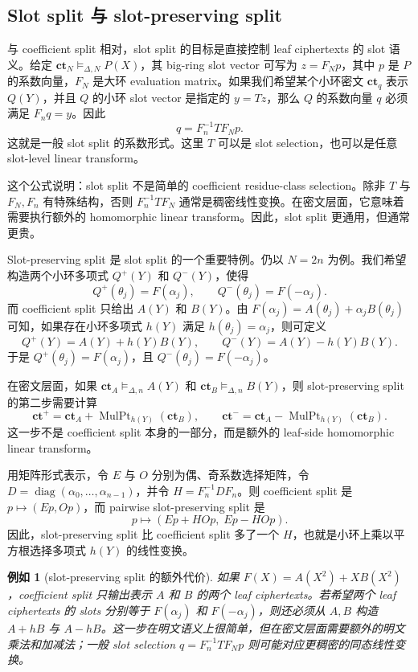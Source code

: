 \documentclass[UTF8,11pt]{article}
\newcommand{\ct}{\mathbf{ct}}
\theoremstyle{definition}
\theoremstyle{plain}
\newtheorem{example}{例如}
\begin{document}
\subsection{Slot split 与 slot-preserving split}
\label{subsec:slot-split-preserving}

与 coefficient split 相对，slot split 的目标是直接控制 leaf ciphertexts 的 slot 语义。给定 \(\ct_N\vDash_{\Delta,N}P(X)\)，其 big-ring slot vector 可写为 \(z=F_Np\)，其中 \(p\) 是 \(P\) 的系数向量，\(F_N\) 是大环 evaluation matrix。如果我们希望某个小环密文 \(\ct_q\) 表示 \(Q(Y)\)，并且 \(Q\) 的小环 slot vector 是指定的 \(y=Tz\)，那么 \(Q\) 的系数向量 \(q\) 必须满足 \(F_nq=y\)。因此
\[
q=F_n^{-1}TF_Np.
\]
这就是一般 slot split 的系数形式。这里 \(T\) 可以是 slot selection，也可以是任意 slot-level linear transform。

这个公式说明：slot split 不是简单的 coefficient residue-class selection。除非 \(T\) 与 \(F_N,F_n\) 有特殊结构，否则 \(F_n^{-1}TF_N\) 通常是稠密线性变换。在密文层面，它意味着需要执行额外的 homomorphic linear transform。因此，slot split 更通用，但通常更贵。

Slot-preserving split 是 slot split 的一个重要特例。仍以 \(N=2n\) 为例。我们希望构造两个小环多项式 \(Q^+(Y)\) 和 \(Q^-(Y)\)，使得
\[
Q^+(\theta_j)=F(\alpha_j),\qquad
Q^-(\theta_j)=F(-\alpha_j).
\]
而 coefficient split 只给出 \(A(Y)\) 和 \(B(Y)\)。由 \(F(\alpha_j)=A(\theta_j)+\alpha_jB(\theta_j)\) 可知，如果存在小环多项式 \(h(Y)\) 满足 \(h(\theta_j)=\alpha_j\)，则可定义
\[
Q^+(Y)=A(Y)+h(Y)B(Y),\qquad
Q^-(Y)=A(Y)-h(Y)B(Y).
\]
于是 \(Q^+(\theta_j)=F(\alpha_j)\)，且 \(Q^-(\theta_j)=F(-\alpha_j)\)。

在密文层面，如果 \(\ct_A\vDash_{\Delta,n}A(Y)\) 和 \(\ct_B\vDash_{\Delta,n}B(Y)\)，则 slot-preserving split 的第二步需要计算
\[
\ct^+=\ct_A+\operatorname{MulPt}_{h(Y)}(\ct_B),
\qquad
\ct^-=\ct_A-\operatorname{MulPt}_{h(Y)}(\ct_B).
\]
这一步不是 coefficient split 本身的一部分，而是额外的 leaf-side homomorphic linear transform。

用矩阵形式表示，令 \(E\) 与 \(O\) 分别为偶、奇系数选择矩阵，令 \(D=\operatorname{diag}(\alpha_0,\ldots,\alpha_{n-1})\)，并令 \(H=F_n^{-1}DF_n\)。则 coefficient split 是 \(p\mapsto(Ep,Op)\)，而 pairwise slot-preserving split 是
\[
p\mapsto(Ep+HOp,\;Ep-HOp).
\]
因此，slot-preserving split 比 coefficient split 多了一个 \(H\)，也就是小环上乘以平方根选择多项式 \(h(Y)\) 的线性变换。

\begin{example}[slot-preserving split 的额外代价]
如果 \(F(X)=A(X^2)+XB(X^2)\)，coefficient split 只输出表示 \(A\) 和 \(B\) 的两个 leaf ciphertexts。若希望两个 leaf ciphertexts 的 slots 分别等于 \(F(\alpha_j)\) 和 \(F(-\alpha_j)\)，则还必须从 \(A,B\) 构造 \(A+hB\) 与 \(A-hB\)。这一步在明文语义上很简单，但在密文层面需要额外的明文乘法和加减法；一般 slot selection \(q=F_n^{-1}TF_Np\) 则可能对应更稠密的同态线性变换。
\end{example}
\end{document}
